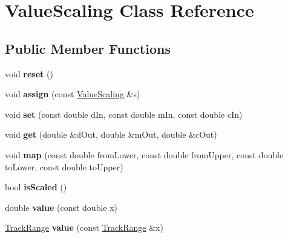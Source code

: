 \hypertarget{classValueScaling}{
\section{ValueScaling Class Reference}
\label{classValueScaling}
}
\subsection*{Public Member Functions}
\begin{DoxyCompactItemize}
\item 
\hypertarget{classValueScaling_a1573c510fcfd32e17a9153eca979de6c}{
void {\bfseries reset} ()}
\label{classValueScaling_a1573c510fcfd32e17a9153eca979de6c}

\item 
\hypertarget{classValueScaling_ae4e70bc846720ee32b66f0ec631844c3}{
void {\bfseries assign} (const \hyperlink{classValueScaling}{ValueScaling} \&s)}
\label{classValueScaling_ae4e70bc846720ee32b66f0ec631844c3}

\item 
\hypertarget{classValueScaling_a1711dbe2437b4fcc31f70b642a88ef38}{
void {\bfseries set} (const double dIn, const double mIn, const double cIn)}
\label{classValueScaling_a1711dbe2437b4fcc31f70b642a88ef38}

\item 
\hypertarget{classValueScaling_ae5dcae3026a091b8b627cd73ec8a1d83}{
void {\bfseries get} (double \&dOut, double \&mOut, double \&cOut)}
\label{classValueScaling_ae5dcae3026a091b8b627cd73ec8a1d83}

\item 
\hypertarget{classValueScaling_ab24a1155d355c8199b3b98d460a0d72a}{
void {\bfseries map} (const double fromLower, const double fromUpper, const double toLower, const double toUpper)}
\label{classValueScaling_ab24a1155d355c8199b3b98d460a0d72a}

\item 
\hypertarget{classValueScaling_a34acbae656b90848da6fb92c3712bd3b}{
bool {\bfseries isScaled} ()}
\label{classValueScaling_a34acbae656b90848da6fb92c3712bd3b}

\item 
\hypertarget{classValueScaling_a8c983d420918ab030e631b9a3d45e616}{
double {\bfseries value} (const double x)}
\label{classValueScaling_a8c983d420918ab030e631b9a3d45e616}

\item 
\hypertarget{classValueScaling_ac211a5384bcac833cae6a5f9fbb3fb01}{
\hyperlink{classTrackRange}{TrackRange} {\bfseries value} (const \hyperlink{classTrackRange}{TrackRange} \&x)}
\label{classValueScaling_ac211a5384bcac833cae6a5f9fbb3fb01}


\end{DoxyCompactItemize}
